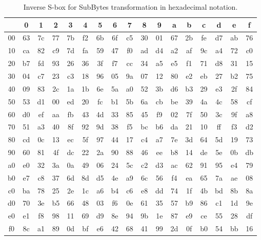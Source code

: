 \begin{table}
\label{invsbox}
\begin{center}
\begin{tabular}{|c|cccccccccccccccc|}\hline%
      &  0 &  1 &  2 &  3 &  4 &  5 &  6 &  7 &  8 &  9 &  a &  b &  c &  d &  e &  f \\\hline
   00 & 63 & 7c & 77 & 7b & f2 & 6b & 6f & c5 & 30 & 01 & 67 & 2b & fe & d7 & ab & 76 \\ 
   10 & ca & 82 & c9 & 7d & fa & 59 & 47 & f0 & ad & d4 & a2 & af & 9c & a4 & 72 & c0 \\ 
   20 & b7 & fd & 93 & 26 & 36 & 3f & f7 & cc & 34 & a5 & e5 & f1 & 71 & d8 & 31 & 15 \\ 
   30 & 04 & c7 & 23 & c3 & 18 & 96 & 05 & 9a & 07 & 12 & 80 & e2 & eb & 27 & b2 & 75 \\ 
   40 & 09 & 83 & 2c & 1a & 1b & 6e & 5a & a0 & 52 & 3b & d6 & b3 & 29 & e3 & 2f & 84 \\ 
   50 & 53 & d1 & 00 & ed & 20 & fc & b1 & 5b & 6a & cb & be & 39 & 4a & 4c & 58 & cf \\ 
   60 & d0 & ef & aa & fb & 43 & 4d & 33 & 85 & 45 & f9 & 02 & 7f & 50 & 3c & 9f & a8 \\ 
   70 & 51 & a3 & 40 & 8f & 92 & 9d & 38 & f5 & bc & b6 & da & 21 & 10 & ff & f3 & d2 \\ 
   80 & cd & 0c & 13 & ec & 5f & 97 & 44 & 17 & c4 & a7 & 7e & 3d & 64 & 5d & 19 & 73 \\ 
   90 & 60 & 81 & 4f & dc & 22 & 2a & 90 & 88 & 46 & ee & b8 & 14 & de & 5e & 0b & db \\ 
   a0 & e0 & 32 & 3a & 0a & 49 & 06 & 24 & 5c & c2 & d3 & ac & 62 & 91 & 95 & e4 & 79 \\ 
   b0 & e7 & c8 & 37 & 6d & 8d & d5 & 4e & a9 & 6c & 56 & f4 & ea & 65 & 7a & ae & 08 \\ 
   c0 & ba & 78 & 25 & 2e & 1c & a6 & b4 & c6 & e8 & dd & 74 & 1f & 4b & bd & 8b & 8a \\ 
   d0 & 70 & 3e & b5 & 66 & 48 & 03 & f6 & 0e & 61 & 35 & 57 & b9 & 86 & c1 & 1d & 9e \\ 
   e0 & e1 & f8 & 98 & 11 & 69 & d9 & 8e & 94 & 9b & 1e & 87 & e9 & ce & 55 & 28 & df \\ 
   f0 & 8c & a1 & 89 & 0d & bf & e6 & 42 & 68 & 41 & 99 & 2d & 0f & b0 & 54 & bb & 16 \\ 
\hline
\end{tabular}
\end{center}
\caption{Inverse S-box for SubBytes transformation in hexadecimal notation.}
\end{table}


